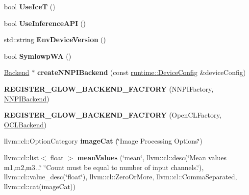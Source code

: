 \begin{DoxyCompactItemize}
bool {\bfseries Use\+IceT} ()
\item 
\mbox{\label{namespaceglow_a4e0df717153aee9e88b3b93b9e7b1f20}} 
bool {\bfseries Use\+Inference\+A\+PI} ()
\item 
\mbox{\label{namespaceglow_a3ce26479e4fabd44848f6189a24ebd83}} 
std\+::string {\bfseries Env\+Device\+Version} ()
\item 
\mbox{\label{namespaceglow_aa1fe70fd305c5fefdd6cda83473d6c0e}} 
bool {\bfseries Symlowp\+WA} ()
\item 
\mbox{\label{namespaceglow_ab301723a3318bf652b369645666612a8}} 
\hyperlink{classglow_1_1_backend}{Backend} $\ast$ {\bfseries create\+N\+N\+P\+I\+Backend} (const \hyperlink{structglow_1_1runtime_1_1_device_config}{runtime\+::\+Device\+Config} \&device\+Config)
\item 
\mbox{\label{namespaceglow_a74ccf066abc84dfe97555dd2602d8724}} 
{\bfseries R\+E\+G\+I\+S\+T\+E\+R\+\_\+\+G\+L\+O\+W\+\_\+\+B\+A\+C\+K\+E\+N\+D\+\_\+\+F\+A\+C\+T\+O\+RY} (N\+N\+P\+I\+Factory, \hyperlink{classglow_1_1_n_n_p_i_backend}{N\+N\+P\+I\+Backend})
\item 
\mbox{\label{namespaceglow_a40768582ed3a9a8a7d8f826d4b9cd372}} 
{\bfseries R\+E\+G\+I\+S\+T\+E\+R\+\_\+\+G\+L\+O\+W\+\_\+\+B\+A\+C\+K\+E\+N\+D\+\_\+\+F\+A\+C\+T\+O\+RY} (Open\+C\+L\+Factory, \hyperlink{classglow_1_1_o_c_l_backend}{O\+C\+L\+Backend})
\item 
\mbox{\label{namespaceglow_a1c5b3c359f0cbd0285d9f94acc95a152}} 
llvm\+::cl\+::\+Option\+Category {\bfseries image\+Cat} (\char`\"{}Image Processing Options\char`\"{})
\item 
\mbox{\label{namespaceglow_ad8bb2533645823cd73d1ed421e90de3a}} 
llvm\+::cl\+::list$<$ float $>$ {\bfseries mean\+Values} (\char`\"{}mean\char`\"{}, llvm\+::cl\+::desc(\char`\"{}Mean values m1,m2,m3...\char`\"{} \char`\"{}Count must be equal to number of input channels.\char`\"{}), llvm\+::cl\+::value\+\_\+desc(\char`\"{}float\char`\"{}), llvm\+::cl\+::\+Zero\+Or\+More, llvm\+::cl\+::\+Comma\+Separated, llvm\+::cl\+::cat(image\+Cat))
\item 

\end{DoxyCompactItemize}
